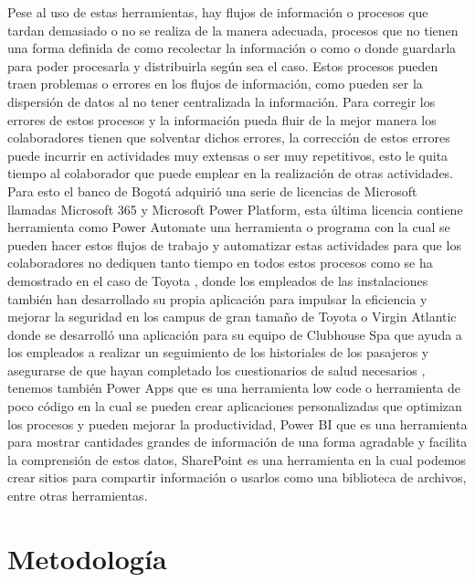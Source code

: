 Pese al uso de estas herramientas, hay flujos de información o procesos que tardan demasiado o no se realiza de la manera adecuada, procesos que no tienen una forma definida de como recolectar la información o como o donde guardarla para poder procesarla y distribuirla según sea el caso. Estos procesos pueden traen problemas o errores en los flujos de información, como pueden ser la dispersión de datos al no tener centralizada la información. Para corregir los errores de estos procesos y la información pueda fluir de la mejor manera los colaboradores tienen que solventar dichos errores, la corrección de estos errores puede incurrir en actividades muy extensas o ser muy repetitivos, esto le quita tiempo al colaborador que puede emplear en la realización de otras actividades. Para esto el banco de Bogotá adquirió una serie de licencias de Microsoft llamadas Microsoft 365 y Microsoft Power Platform, esta última licencia contiene herramienta como Power Automate una herramienta o programa con la cual se pueden hacer estos flujos de trabajo y automatizar estas actividades para que los colaboradores no dediquen tanto tiempo en todos estos procesos como se ha demostrado en el caso de Toyota \citep{Microsoft2017}, donde los empleados de las instalaciones también han
desarrollado su propia aplicación para impulsar la eficiencia y mejorar la seguridad en los campus de gran tamaño de Toyota o
Virgin Atlantic donde se desarrolló una aplicación para su equipo de Clubhouse Spa que ayuda a los empleados a realizar un
seguimiento de los historiales de los pasajeros y asegurarse de que hayan completado los cuestionarios de salud necesarios
\citep{Atlantic2019}, tenemos también Power Apps que es una herramienta low code o herramienta de poco código en la cual se pueden crear aplicaciones personalizadas que optimizan los procesos y pueden mejorar la productividad, Power BI que es una herramienta para mostrar cantidades grandes de información de una forma agradable y facilita la comprensión de estos datos, SharePoint es una herramienta en la cual podemos crear sitios para compartir información o usarlos como una biblioteca de archivos, entre otras herramientas.

\section{Metodología}


